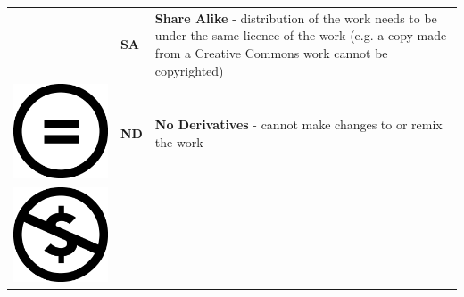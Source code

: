 \begin{table}[]
\begin{tabular}{p{1cm} p{1cm} p{10cm}}
\begin{minipage}{.1\textwidth}
    \end{minipage} & \textbf{SA} & \textbf{Share Alike} - distribution of the work needs to be under the same licence of the work (e.g. a copy made from a Creative Commons work cannot be copyrighted) 
    \\
 \begin{minipage}{.1\textwidth}
      \includegraphics[scale=.07]{images/cc_nd.png}
    \end{minipage} & \textbf{ND} & \textbf{No Derivatives} - cannot make changes to or remix the work                                                                                                    \\
 \begin{minipage}{.1\textwidth}
      \includegraphics[scale=.07]{images/cc_nc.png}

\end{minipage}
\end{tabular}
\end{table}
